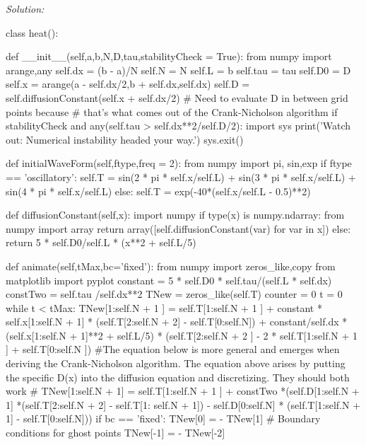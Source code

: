 \ifsolutions
\textit{Solution:}\\
\begin{codeexample}
\begin{VerbatimOut}{\listingFile}



class heat():


    def __init__(self,a,b,N,D,tau,stabilityCheck = True):
        from numpy import arange,any
        self.dx = (b - a)/N
        self.N = N
        self.L  = b
        self.tau = tau
        self.D0 = D
        self.x = arange(a - self.dx/2,b + self.dx,self.dx)
        self.D = self.diffusionConstant(self.x + self.dx/2)  # Need to evaluate D in between grid points because
                                                            # that's what comes out of the Crank-Nicholson algorithm
        if stabilityCheck and any(self.tau > self.dx**2/self.D/2):
            import sys
            print('Watch out: Numerical instability headed your way.')
            sys.exit()

    def initialWaveForm(self,ftype,freq = 2):
        from numpy import pi, sin,exp
        if ftype == 'oscillatory':
            self.T = sin(2 * pi * self.x/self.L) + sin(3 * pi * self.x/self.L) + sin(4 * pi * self.x/self.L)
        else:
            self.T = exp(-40*(self.x/self.L - 0.5)**2)

    def diffusionConstant(self,x):
        import numpy
        if type(x) is numpy.ndarray:
            from numpy import array
            return array([self.diffusionConstant(var) for var in x])
        else:
            return 5 * self.D0/self.L * (x**2 + self.L/5)

    def animate(self,tMax,bc='fixed'):
        from numpy import zeros_like,copy
        from matplotlib import pyplot
        constant = 5 * self.D0 * self.tau/(self.L * self.dx)
        constTwo = self.tau /self.dx**2
        TNew = zeros_like(self.T)
        counter = 0
        t = 0
        while t < tMax:
            TNew[1:self.N + 1 ] = self.T[1:self.N + 1 ] + constant * self.x[1:self.N + 1] * (self.T[2:self.N + 2] - self.T[0:self.N])  + constant/self.dx * (self.x[1:self.N + 1]**2 + self.L/5) *  (self.T[2:self.N + 2 ] - 2 * self.T[1:self.N + 1 ] + self.T[0:self.N ])
            #The equation below is more general and emerges when deriving the Crank-Nicholson algorithm.  The equation above arises by putting the specific D(x) into the diffusion equation and discretizing.  They should both work
            #            TNew[1:self.N + 1] = self.T[1:self.N + 1 ] + constTwo *(self.D[1:self.N + 1] *(self.T[2:self.N + 2] - self.T[1: self.N + 1]) - self.D[0:self.N] * (self.T[1:self.N + 1] - self.T[0:self.N]))
            if bc == 'fixed':
                TNew[0] = - TNew[1] # Boundary conditions for ghost points
                TNew[-1] = - TNew[-2]


\end{VerbatimOut}
\end{codeexample}
